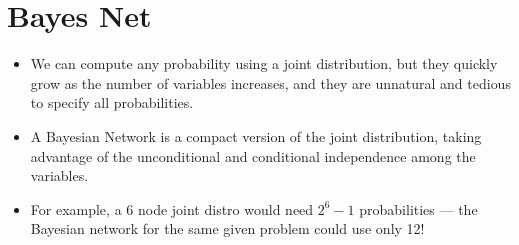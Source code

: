\documentclass{article}
\begin{document}
\section{Bayes Net}
\begin{itemize}
    \item We can compute any probability using a joint distribution, but they quickly grow as the number of variables increases, and they are unnatural and tedious to specify all probabilities.  
    \item A Bayesian Network is a compact version of the joint distribution, taking advantage of the unconditional and conditional independence among the variables. 
    \item For example, a 6 node joint distro would need $2^6 - 1$ probabilities --- the Bayesian network for the same given problem could use only 12!
\end{itemize}
\end{document}
